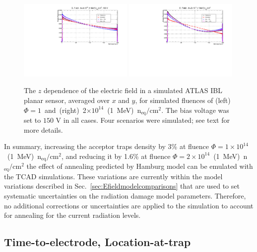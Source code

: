 \begin{figure}[!htpb]
\centering
\includegraphics[width=0.49\textwidth]{TCAD_EField_variations_1e14_150V.pdf}
\includegraphics[width=0.49\textwidth]{TCAD_EField_variations_2e14_150V.pdf}
\caption{\label{fig:EFieldTCADAnnealing}The $z$ dependence of the electric field in a simulated ATLAS IBL planar sensor, averaged over $x$ and $y$, for  simulated
  fluences of (left)~$\Phi=1$~and~(right)~2$\times10^{14}$~(1~MeV)~n$_\text{eq}/\text{cm}^{2}$. The
bias voltage was set to $150$ V in all cases. Four scenarios were simulated; see text for more 
  details.}
\end{figure}

In summary, increasing the acceptor traps density by 3\% at fluence 
$\Phi=1\times10^{14}$~(1~MeV)~n$_\text{eq}/\text{cm}^{2}$, and reducing it by 1.6\% 
at fluence $\Phi=2\times10^{14}$~(1~MeV)~n$_\text{eq}/\text{cm}^{2}$ the effect of annealing 
predicted by Hamburg model can be emulated with the TCAD simulations.   These variations are currently within the model variations described in Sec.~\ref{sec:Efieldmodelcomparisons} that are used to set systematic uncertainties on the radiation damage model parameters.  Therefore, no additional corrections or uncertainties are applied to the simulation to account for annealing for the current radiation levels.


\subsection{Time-to-electrode, Location-at-trap}
\label{sec:maps}

